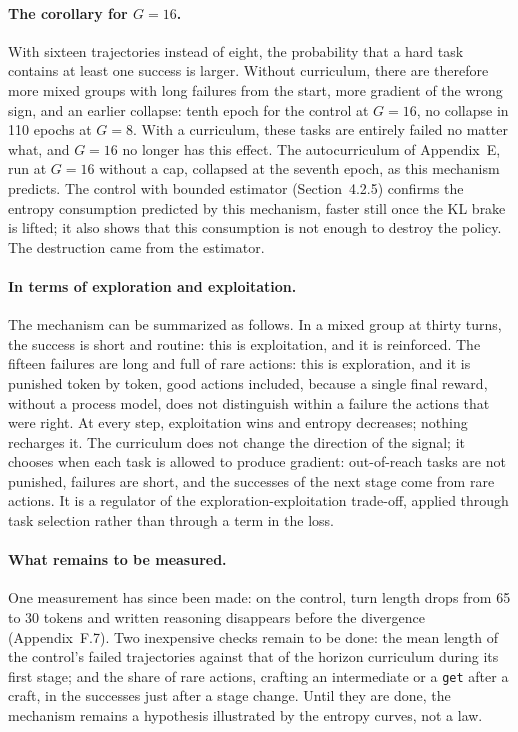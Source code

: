 \documentclass[11pt,a4paper]{article}
\begin{document}
\paragraph{The corollary for $G=16$.} With sixteen trajectories instead of eight, the probability that a hard task contains at least one success is larger. Without curriculum, there are therefore more mixed groups with long failures from the start, more gradient of the wrong sign, and an earlier collapse: tenth epoch for the control at $G=16$, no collapse in 110 epochs at $G=8$. With a curriculum, these tasks are entirely failed no matter what, and $G=16$ no longer has this effect. The autocurriculum of Appendix~E, run at $G=16$ without a cap, collapsed at the seventh epoch, as this mechanism predicts. The control with bounded estimator (Section~4.2.5) confirms the entropy consumption predicted by this mechanism, faster still once the KL brake is lifted; it also shows that this consumption is not enough to destroy the policy. The destruction came from the estimator.

\paragraph{In terms of exploration and exploitation.} The mechanism can be summarized as follows. In a mixed group at thirty turns, the success is short and routine: this is exploitation, and it is reinforced. The fifteen failures are long and full of rare actions: this is exploration, and it is punished token by token, good actions included, because a single final reward, without a process model, does not distinguish within a failure the actions that were right. At every step, exploitation wins and entropy decreases; nothing recharges it. The curriculum does not change the direction of the signal; it chooses when each task is allowed to produce gradient: out-of-reach tasks are not punished, failures are short, and the successes of the next stage come from rare actions. It is a regulator of the exploration-exploitation trade-off, applied through task selection rather than through a term in the loss.


\paragraph{What remains to be measured.} One measurement has since been made: on the control, turn length drops from 65 to 30 tokens and written reasoning disappears before the divergence (Appendix~F.7). Two inexpensive checks remain to be done: the mean length of the control's failed trajectories against that of the horizon curriculum during its first stage; and the share of rare actions, crafting an intermediate or a \texttt{get} after a craft, in the successes just after a stage change. Until they are done, the mechanism remains a hypothesis illustrated by the entropy curves, not a law.
\end{document}
